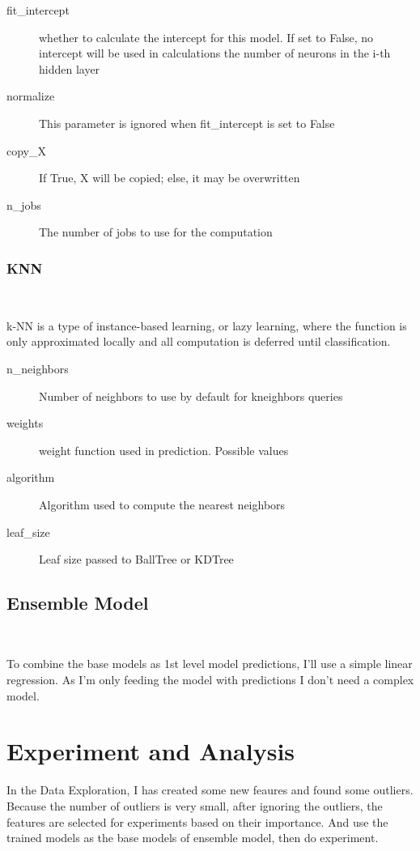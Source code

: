 \begin{description}
	\item[fit_intercept] whether to calculate the intercept for this model. If 
	set to False, no intercept will be used in calculations 
	the number of neurons in the i-th hidden layer
	\item[normalize] This parameter is ignored when fit_intercept is set to 
	False
	\item[copy_X] If True, X will be copied; else, it may be overwritten
	\item[n_jobs] The number of jobs to use for the computation
\end{description}

\subsubsection{KNN}
\

k-NN is a type of instance-based learning, 
or lazy learning, where the function is 
only approximated locally and all 
computation is deferred until classification. 


\begin{description}
	\item[n_neighbors] Number of neighbors to use by default for kneighbors 
	queries
	\item[weights] weight function used in prediction. Possible values
	\item[algorithm] Algorithm used to compute the nearest neighbors
	\item[leaf_size] Leaf size passed to BallTree or KDTree
\end{description}

\subsection{Ensemble Model}
\

To combine the base models as 1st level 
model predictions, I'll use a simple 
linear regression. As I'm only feeding 
the model with predictions 
I don't need a complex model.

\section{Experiment and Analysis}

In the Data Exploration, 
I has created some new feaures 
and found some outliers.
Because the number of outliers is very small, 
after ignoring the outliers, the features 
are selected for experiments based on their importance.
And use the trained models as 
the base models of ensemble model,
then do experiment.

